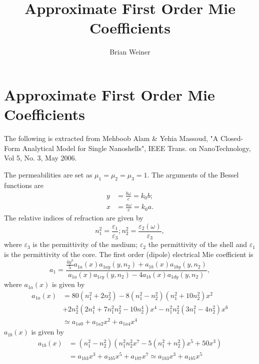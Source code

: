 \documentclass[aps,preprint]{revtex4}%
\begin{document}
\preprint{ }
\title{Approximate First Order Mie Coefficients}
\author{Brian Weiner}

\section{Approximate First Order Mie Coefficients}

The following is extracted from Mehboob Alam \& Yehia Massoud, "A Closed-Form
Analytical Model for Single Nanoshells", IEEE Trans. on NanoTechnology, Vol 5,
No. 3, May 2006.

The permeabilities are set as $\mu_{1}=\mu_{2}=\mu_{3}=1.$ The arguments of
the Bessel functions are%
\begin{align}
y  &  =\frac{b\omega}{c}=k_{0}b;\\
x  &  =\frac{a\omega}{c}=k_{0}a.
\end{align}
The relative indices of refraction are given by%
\begin{equation}
n_{1}^{2}=\frac{\varepsilon_{1}}{\varepsilon_{3}};n_{2}^{2}=\frac
{\varepsilon_{2}\left(  \omega\right)  }{\varepsilon_{3}},
\end{equation}
where $\varepsilon_{3}$ is the permittivity of the medium; $\varepsilon_{2}$
the permittivity of the shell and $\varepsilon_{1}$ is the permittivity of the
core. The first order (dipole) electrical Mie coefficient is
\begin{equation}
a_{1}=\frac{\frac{4y^{3}}{5}a_{1a}\left(  x\right)  a_{1ay}\left(
y,n_{2}\right)  +a_{1b}\left(  x\right)  a_{1by}\left(  y,n_{2}\right)
}{a_{1a}\left(  x\right)  a_{1cy}\left(  y,n_{2}\right)  -4a_{1b}\left(
x\right)  a_{1dy}\left(  y,n_{2}\right)  },
\end{equation}
where $a_{1a}\left(  x\right)  $ is given by
\begin{align}
a_{1a}\left(  x\right)   &  =80\left(  n_{1}^{2}+2n_{2}^{2}\right)  -8\left(
n_{1}^{2}-n_{2}^{2}\right)  \left(  n_{1}^{2}+10n_{2}^{2}\right)
x^{2}\nonumber\\
&  +2n_{2}^{2}\left(  2n_{1}^{4}+7n_{1}^{2}n_{2}^{2}-10n_{2}^{4}\right)
x^{4}-n_{1}^{2}n_{2}^{2}\left(  3n_{1}^{2}-4n_{2}^{2}\right)  x^{6}\nonumber\\
&  \simeq a_{1a0}+a_{1a2}x^{2}+a_{1a4}x^{4}%
\end{align}
$a_{1b}\left(  x\right)  $ is given by%
\begin{align}
a_{1b}\left(  x\right)   &  =\left(  n_{1}^{2}-n_{2}^{2}\right)  \left(
n_{1}^{2}n_{2}^{2}x^{7}-5\left(  n_{1}^{2}+n_{2}^{2}\right)  x^{5}%
+50x^{3}\right) \nonumber\\
&  =a_{1b3}x^{3}+a_{1b5}x^{5}+a_{1b7}x^{7}\simeq a_{1b3}x^{3}+a_{1b5}x^{5}%
\end{align}
\end{document}
